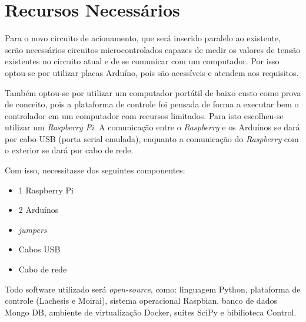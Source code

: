 
\chapter{Recursos Necessários}%
\label{chp:needed-resources}

Para o novo circuito de acionamento, que será inserido paralelo ao existente,
serão necessários circuitos microcontrolados capazes de medir os valores de
tensão existentes no circuito atual e de se comunicar com um computador. Por
isso optou-se por utilizar placas Arduíno, pois são acessíveis e atendem aos
requisitos.

Também optou-se por utilizar um computador portátil de baixo custo como prova de
conceito, pois a plataforma de controle foi pensada de forma a executar bem o
controlador em um computador com recursos limitados. Para isto escolheu-se
utilizar um \textit{Raspberry Pi}. A comunicação entre o \textit{Raspberry} e os
Arduínos se dará por cabo USB (porta serial emulada), enquanto a comunicação do
\textit{Raspberry} com o exterior se dará por cabo de rede.

Com isso, necessitasse dos seguintes componentes:

\begin{itemize}
      \item 1 Raspberry Pi
      \item 2 Arduínos
      \item \textit{jumpers}
      \item Cabos USB
      \item Cabo de rede
\end{itemize}

Todo software utilizado será \textit{open-source}, como: linguagem Python,
plataforma de controle (Lachesis e Moirai), sistema operacional Raspbian, banco
de dados Mongo DB, ambiente de virtualização Docker, suítes SciPy e bibilioteca
Control.
